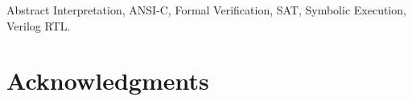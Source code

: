 \documentclass[journal]{IEEEtran}
\theoremstyle{definition}
\begin{document}
\begin{IEEEkeywords} %
Abstract Interpretation, 
ANSI-C, 
Formal Verification, 
SAT, 
Symbolic Execution,
Verilog RTL. 
\end{IEEEkeywords}


\section*{Acknowledgments}










\end{document}
